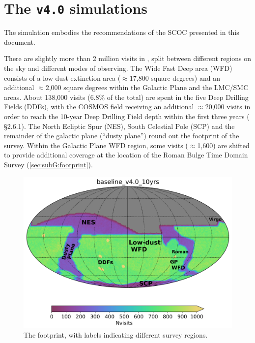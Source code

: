 \section{The \texttt{v4.0} simulations} \label{sec:baseline4_0}

The  simulation embodies the recommendations of the SCOC presented in this document. 

There are slightly more than 2 million visits in , split between different regions on the sky and different modes of observing. The Wide Fast Deep area (WFD) consists of a low dust extinction area (\mbox{$\approx$17,800} square degrees) and an additional \mbox{$\approx$2,000} square degrees within the Galactic Plane and the LMC/SMC areas. About 138,000 visits (6.8\% of the total) are spent in the five Deep Drilling Fields (DDFs), with the COSMOS field receiving an additional \mbox{$\approx$20,000} visits in order to reach the 10-year Deep Drilling Field depth within the first three years ( \S2.6.1). The North Ecliptic Spur (NES), South Celestial Pole (SCP) and the remainder of the galactic plane (``dusty plane'') round out the footprint of the survey. Within the Galactic Plane WFD region, some visits (\mbox{$\approx$1,600}) are shifted to provide additional coverage at the location of the Roman Bulge Time Domain Survey (\autoref{sec:subG:footprint}). 

\begin{figure}
  \centering
    \includegraphics[width=0.7\linewidth]{figures/baseline_v4_0_10yrs_nvisits.png}
    \caption{The  footprint, with labels indicating different survey regions.}
    \label{fig:footprint_v4}
\end{figure}

